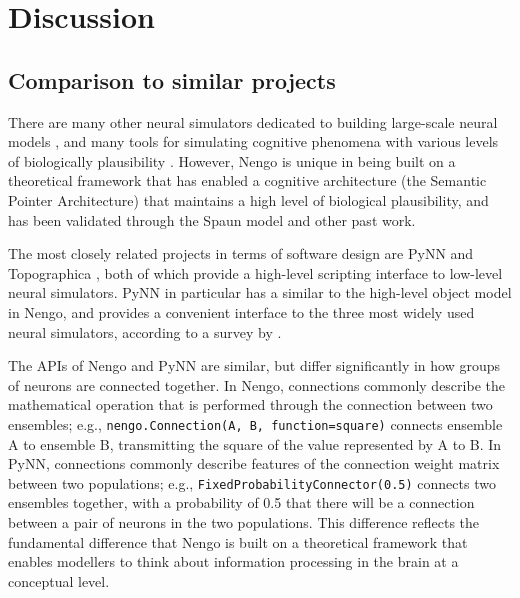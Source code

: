 \documentclass{frontiersSCNS}
\begin{document}
\section{Discussion}

\subsection{Comparison to similar projects}

There are many other neural simulators
dedicated to building large-scale neural models
\citep{eppler2009,goodman2008,hines2009},
and many tools for simulating cognitive phenomena
with various levels of biologically plausibility
\citep{cooper1998,sun2001,anderson2004,franklin2007,
  aisa2008,dekamps2008,laird2012}.
However, Nengo is unique in being built
on a theoretical framework
that has enabled a cognitive architecture
(the Semantic Pointer Architecture)
that maintains a high level
of biological plausibility,
and has been validated
through the Spaun model and other past work.

The most closely related projects
in terms of software design
are PyNN \citep{davison2009}
and Topographica \citep{bednar2009},
both of which provide a high-level scripting
interface to low-level neural simulators.
PyNN in particular has a similar to the
high-level object model in Nengo,
and provides a convenient interface
to the three most widely used
neural simulators, according
to a survey by \citet{hanke2011}.

The APIs of Nengo and PyNN are similar,
but differ significantly
in how groups of neurons are connected together.
In Nengo, connections commonly describe
the mathematical operation that is performed
through the connection between
two ensembles;
e.g., \texttt{nengo.Connection(A, B,
function=square)} connects ensemble A
to ensemble B, transmitting the square of
the value represented by A to B.
In PyNN, connections commonly describe
features of the connection weight matrix
between two populations;
e.g., \texttt{FixedProbabilityConnector(0.5)}
connects two ensembles together,
with a probability of 0.5
that there will be a connection
between a pair of neurons in the two populations.
This difference reflects the
fundamental difference that Nengo
is built on a theoretical framework
that enables modellers to think
about information processing in the brain
at a conceptual level.
\end{document}
